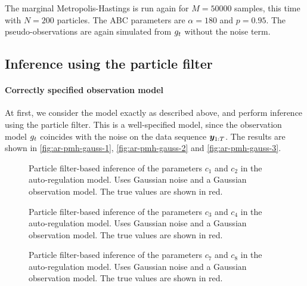 The marginal Metropolis-Hastings is run again for $M = 50000$ samples, this time with $N = 200$ particles. The ABC parameters are $\alpha = 180$ and $p = 0.95$. The pseudo-observations are again simulated from $g_t$ without the noise term.

\subsection{Inference using the particle filter}


\paragraph{Correctly specified observation model}
At first, we consider the model exactly as described above, and perform inference using the particle filter. This is a well-specified model, since the observation model $g_t$ coincides with the noise on the data sequence $\bm{y}_{1:T}$. The results are shown in \autoref{fig:ar-pmh-gauss-1}, \autoref{fig:ar-pmh-gauss-2} and \autoref{fig:ar-pmh-gauss-3}.

\begin{figure}[htp]%
    \centering
    \qquad
    \caption{Particle filter-based inference of the parameters $c_1$ and $c_2$ in the auto-regulation model. Uses Gaussian noise and a Gaussian observation model. The true values are shown in red.}%
    \label{fig:ar-pmh-gauss-1}%
\end{figure}

\begin{figure}[htp]%
    \centering
    \qquad
    \caption{Particle filter-based inference of the parameters $c_3$ and $c_4$ in the auto-regulation model. Uses Gaussian noise and a Gaussian observation model. The true values are shown in red.}%
    \label{fig:ar-pmh-gauss-2}%
\end{figure}

\begin{figure}[htp]%
    \centering
    \qquad
    \caption{Particle filter-based inference of the parameters $c_7$ and $c_8$ in the auto-regulation model. Uses Gaussian noise and a Gaussian observation model. The true values are shown in red.}%
    \label{fig:ar-pmh-gauss-3}%
\end{figure}

